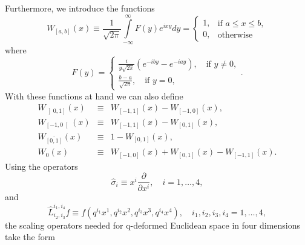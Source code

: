 \documentclass[a4paper,11pt,oneside]{article}
\newcommand{\text}[1]{\mbox{#1}}
\begin{document}
Furthermore, we introduce the functions 
\begin{equation}
W_{\left[ a,b\right] }(x)\equiv \frac{1}{\sqrt{2\pi }}\int\limits_{-\infty
}^{\infty }F\left( y\right) e^{ixy}dy=\left\{ 
\begin{array}{c}
1, \\ 
0,
\end{array}
\right. \left. 
\begin{array}{l}
\text{if }a\leq x\leq b, \\ 
\text{otherwise}
\end{array}
\right. 
\end{equation}
where 
\begin{equation}
F\left( y\right) =\left\{ 
\begin{array}{c}
\frac{i}{y\sqrt{2\pi }}\left( e^{-iby}-e^{-iay}\right) ,\quad \text{if }%
y\neq 0, \\ 
\frac{b-a}{\sqrt{2\pi }},\quad \text{if }y=0,
\end{array}
\right. .
\end{equation}
With these functions at hand we can also define 
\begin{eqnarray}
W_{\left] 0,1\right] }\left( x\right)  &\equiv &W_{\left[ -1,1\right]
}\left( x\right) -W_{\left[ -1,0\right] }\left( x\right) , \\
W_{\left[ -1,0\right[ }\left( x\right)  &\equiv &W_{\left[ -1,1\right]
}\left( x\right) -W_{\left[ 0,1\right] }\left( x\right) ,  \nonumber \\
W_{\overline{\left[ 0,1\right] }}\left( x\right)  &\equiv &1-W_{\left[
0,1\right] }\left( x\right) ,  \nonumber \\
W_{0}\left( x\right)  &\equiv &W_{\left[ -1,0\right] }\left( x\right)
+W_{\left[ 0,1\right] }\left( x\right) -W_{\left[ -1,1\right] }\left(
x\right) .  \nonumber
\end{eqnarray}
Using the operators \cite{WW01} 
\begin{equation}
\hat{\sigma}_{i}\equiv x^{i}\frac{\partial }{\partial x^{i}},\quad
i=1,\ldots ,4,
\end{equation}
and
\begin{equation}
\hat{L}^{i_1,i_4}_{i_2,i_3} f\equiv f(q^{i_1} x^1,q^{i_2}
x^2,q^{i_3}x^3,q^{i_4}x^4),
\quad i_1,i_2,i_3,i_4 = 1,\dots ,4,
\end{equation}
the scaling operators needed for q-deformed Euclidean space in four
dimensions take the form 
\end{document}
